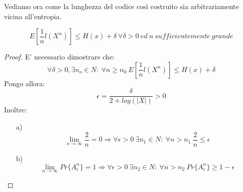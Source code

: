 Vediamo ora come la lunghezza del codice così costruito sia arbitrariamente vicina all'entropia.


\begin{teorema}
\[
 E \left [ \frac{1}{n} l(X^n) \right] \le H(x)+\delta \ \forall \delta >0 \ ed \ n \ sufficientemente \ grande
\]
\begin{proof}
E' necessario dimostrare che:
\[
 \forall \delta >0, \exists n_o \in N: \ \forall n \ge n_0 \ E \left [ \frac{1}{n} l(X^n) \right] \le H(x)+\delta
\]
 Pongo allora:
\[
 \epsilon=\frac{\delta}{2+log(|X|)} > 0
\]
Inoltre:
 \begin{itemize}
  \item[a)]
   \[
    \lim_{n \to \infty} \frac{2}{n}=0 \Rightarrow \forall \epsilon >0 \ \exists n_1 \in N: \ \forall n>n_1 \ \frac{2}{n} \le \epsilon
   \]
  \item[b)]
   \[
    \lim_{n \to \infty} Pr\{A_{\epsilon}^n\}=1 \Rightarrow \forall \epsilon >0 \ \exists n_2 \in N: \ \forall n>n_2 \ 
Pr\{A_{\epsilon}^n\} \ge 1-\epsilon
   \]
 \end{itemize}


\end{proof}
\end{teorema}
